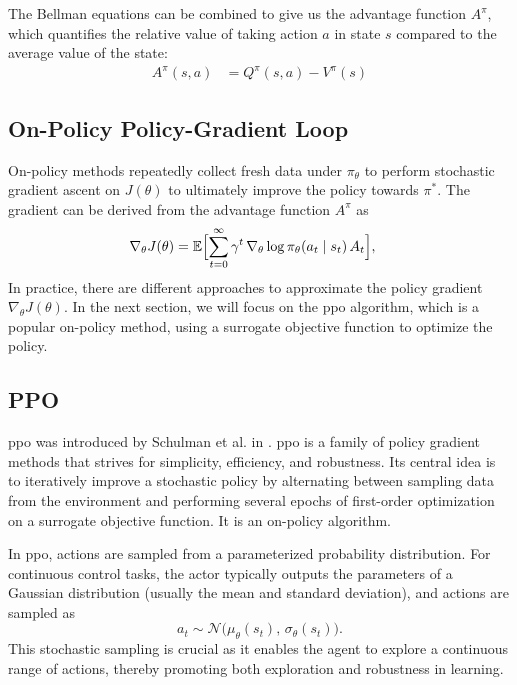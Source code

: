 The Bellman equations can be combined to give us the advantage function \(A^\pi\), which quantifies the relative value of taking action \(a\) in state \(s\) compared to the average value of the state:
\begin{align}
\label{eq:advantage}
A^\pi(s,a)
&= Q^\pi(s,a) - V^\pi(s)
\end{align}

\subsection{On-Policy Policy-Gradient Loop}  
On-policy methods repeatedly collect fresh data under \(\pi_\theta\) to perform stochastic gradient ascent on \(J(\theta)\) to ultimately improve the policy towards \(\pi^*\). The gradient can be derived from the advantage function \(A^\pi\) as
\begin{align}
\label{eq:policy_gradient}
\nabla_\theta J(\theta)
&= \mathbb{E}\Bigl[\sum_{t=0}^\infty \gamma^t\,\nabla_\theta \log \pi_\theta(a_t\mid s_t)\,A_t\Bigr],
\end{align}
In practice, there are different approaches to approximate the policy gradient \(\nabla_{\theta}J(\theta)\). In the next section, we will focus on the \gls{ppo} algorithm, which is a popular on-policy method, using a surrogate objective function to optimize the policy.

\subsection{PPO}
\gls{ppo} was introduced by Schulman et al. in \cite{schulman2017proximal}. \gls{ppo} is a family of policy gradient methods that strives for simplicity, efficiency, and robustness. Its central idea is to iteratively improve a stochastic policy by alternating between sampling data from the environment and performing several epochs of first-order optimization on a surrogate objective function. It is an on-policy algorithm.

In \gls{ppo}, actions are sampled from a parameterized probability distribution. For continuous control tasks, the actor typically outputs the parameters of a Gaussian distribution (usually the mean and standard deviation), and actions are sampled as
\[
a_t \sim \mathcal{N}\big(\mu_\theta(s_t),\, \sigma_\theta(s_t)\big).
\]
This stochastic sampling is crucial as it enables the agent to explore a continuous range of actions, thereby promoting both exploration and robustness in learning.

